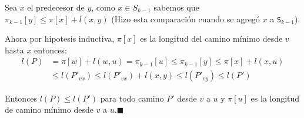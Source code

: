 \begin{demo}
\begin{itemize}
          Sea \(x\) el predecesor de \(y\), como \(x\in S_{k-1}\) sabemos que \(\pi_{k-1}[y]\leq\pi[x] + l(x,y)\) (Hizo esta comparación cuando se agregó \(x\) a \texttt{S}\(_{k-1}\)).
  \end{itemize}
\end{demo}
\begin{demoPart}
  Ahora por hipotesis inductiva, \(\pi[x]\) es la longitud del camino mínimo desde \(v\) hasta \(x\) entonces:
  \begin{align*}
    l(P) & = \pi[w] + l(w,u) = \pi_{k-1}[u] \leq \pi_{k-1}[y] \leq \pi[x] + l(x,u) \\
         & \leq l(P'_{vx}) \leq l(P'_{vx}) + l(x,y) \leq l(P'_{vy}) \leq l(P')
  \end{align*}

  Entonces \(l(P)\leq l(P')\) para todo camino \(P'\) desde \(v\) a \(u\) y \(\pi[u]\) es la longitud de camino mínimo desde \(v\) a \(u\).\hfill\(\blacksquare\)
\end{demoPart}
